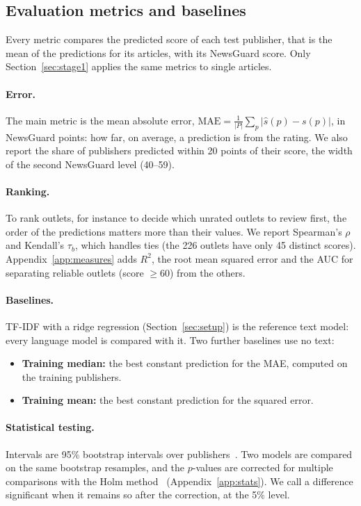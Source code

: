 \documentclass[11pt,a4paper]{article}
\begin{document}
\subsection{Evaluation metrics and baselines}\label{sec:metrics}
Every metric compares the predicted score of each test publisher, that is the mean of the predictions for its
articles, with its NewsGuard score. Only Section~\ref{sec:stage1} applies the same metrics to single articles.

\paragraph{Error.} The main metric is the mean absolute error, $\mathrm{MAE} = \frac{1}{|P|} \sum_{p} |\hat{s}(p) -
s(p)|$, in NewsGuard points: how far, on average, a prediction is from the rating. We also report the share of
publishers predicted within 20 points of their score, the width of the second NewsGuard level (40--59).

\paragraph{Ranking.} To rank outlets, for instance to decide which unrated outlets to review first, the order of the
predictions matters more than their values. We report Spearman's $\rho$ and Kendall's $\tau_b$, which handles ties (the
226 outlets have only 45 distinct scores). Appendix~\ref{app:measures} adds $R^2$, the root mean squared
error and the AUC for separating reliable outlets (score $\geq 60$) from the others.

\paragraph{Baselines.} TF-IDF with a ridge regression (Section~\ref{sec:setup}) is the reference text model: every
language model is compared with it. Two further baselines use no text:
\begin{itemize}
  \item \textbf{Training median:} the best constant prediction for the MAE, computed on the training publishers.
  \item \textbf{Training mean:} the best constant prediction for the squared error.
\end{itemize}

\paragraph{Statistical testing.} Intervals are 95\% bootstrap intervals over publishers~\cite{efron1979bootstrap}. Two
models are compared on the same bootstrap resamples, and the $p$-values are corrected for multiple comparisons with the
Holm method~\cite{holm1979simple} (Appendix~\ref{app:stats}). We call a difference significant when it
remains so after the correction, at the 5\% level.
\end{document}
